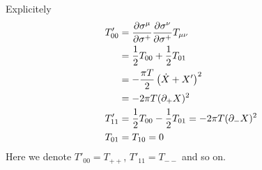 \begin{enumerate}[label=(\alph*)]
		Explicitely
		\begin{align*}
			T'_{00} &= \pdv{\sigma^\mu}{\sigma^+} \pdv{\sigma^\nu}{\sigma^+} T_{\mu\nu} \\
					  &= \frac{1}{2} T_{00} + \frac{1}{2} T_{01} \\
					  &= -\frac{\pi T}{2} \left( \dot{X} + X' \right)^2 \\
					  &= -2 \pi T (\partial_+ X)^2 \\
			T'_{11} &= \frac{1}{2} T_{00} - \frac{1}{2} T_{01} = -2\pi T  (\partial_- X)^2 \\
			T_{01} &= T_{10} = 0
		\end{align*}
		Here we denote $T'_{00} = T_{++}$, $T'_{11} = T_{--}$ and so on. 
\end{enumerate}

